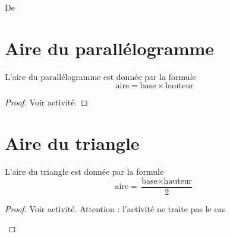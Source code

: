 


De \cite{SIUXooOJshFN}

\section{Aire du parallélogramme}


\begin{propriete}
    L'aire du parallélogramme est donnée par la formule 
    \begin{equation}
        \text{aire}=\text{base}\times \text{hauteur}
    \end{equation}
\end{propriete}

\begin{proof}
    Voir activité.
\end{proof}


\begin{center}
   
\end{center}





\section{Aire du triangle}

\begin{propriete}
    L'aire du triangle est donnée par la formule 
    \begin{equation}
        \text{aire}=\frac{ \text{base}\times \text{hauteur}}{2}
    \end{equation}
\end{propriete}

\begin{proof}
    Voir activité. Attention : l'activité ne traite pas le cas

\begin{center}
   
\end{center}

\end{proof}


